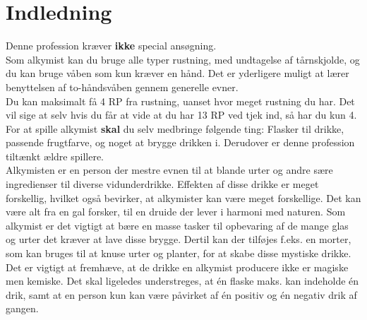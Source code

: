 
\chapter{Indledning}

Denne profession kræver \textbf{ikke} special ansøgning.\\ 
Som alkymist kan du bruge alle typer rustning, med undtagelse af tårnskjolde, og du kan bruge våben som kun kræver en hånd. Det er yderligere muligt at lærer benyttelsen af to-håndsvåben gennem generelle evner.\\
Du kan maksimalt få 4 RP fra rustning, uanset hvor meget rustning du har. Det vil sige at selv hvis du får at vide at du har 13 RP ved tjek ind, så har du kun 4.\\

For at spille alkymist \textbf{skal} du selv medbringe følgende ting: Flasker til drikke, passende frugtfarve, og noget at brygge drikken i. Derudover er denne profession tiltænkt ældre spillere.\\

Alkymisten er en person der mestre evnen til at blande urter og andre sære ingredienser til diverse vidunderdrikke. Effekten af disse drikke er meget forskellig, hvilket også bevirker, at alkymister kan være meget forskellige. Det kan være alt fra en gal forsker, til en druide der lever i harmoni med naturen.
Som alkymist er det vigtigt at bære en masse tasker til opbevaring af de mange glas og urter det kræver at lave disse brygge. Dertil kan der tilføjes f.eks. en morter, som kan bruges til at knuse urter og planter, for at skabe disse mystiske drikke.\\
Det er vigtigt at fremhæve, at de drikke en alkymist producere ikke er magiske men kemiske. Det skal ligeledes understreges, at én flaske maks. kan indeholde én drik, samt at en person kun kan være påvirket af én positiv og én negativ drik af gangen.\\